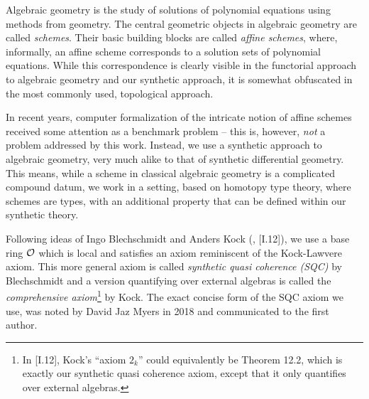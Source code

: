 
Algebraic geometry is the study of solutions of polynomial equations using methods from geometry.
The central geometric objects in algebraic geometry are called \emph{schemes}.
Their basic building blocks are called \emph{affine schemes},
where, informally, an affine scheme corresponds to a solution sets of polynomial equations.
While this correspondence is clearly visible in the functorial approach to algebraic geometry and our synthetic approach,
it is somewhat obfuscated in the most commonly used, topological approach.

In recent years,
computer formalization of the intricate notion of affine schemes
received some attention as a benchmark problem
-- this is, however, \emph{not} a problem addressed by this work.
Instead, we use a synthetic approach to algebraic geometry,
very much alike to that of synthetic differential geometry.
This means, while a scheme in classical algebraic geometry is a complicated compound datum,
we work in a setting, based on homotopy type theory, where schemes are types,
with an additional property that can be defined within our synthetic theory.

Following ideas of Ingo Blechschmidt and Anders Kock  (\cite{ingo-thesis}, \cite{kock-sdg}[I.12]),
we use a base ring $\mathcal O$ which is local and satisfies an axiom reminiscent of the Kock-Lawvere axiom.
This more general axiom is called \emph{synthetic quasi coherence (SQC)} by Blechschmidt and
a version quantifying over external algebras is called the \emph{comprehensive axiom}\footnote{
  In \cite{kock-sdg}[I.12], Kock's ``axiom $2_k$'' could equivalently be Theorem 12.2,
  which is exactly our synthetic quasi coherence axiom, except that it only quantifies over external algebras.
}
by Kock.
The exact concise form of the SQC axiom we use, was noted by David Jaz Myers in 2018 and communicated to the first author.

